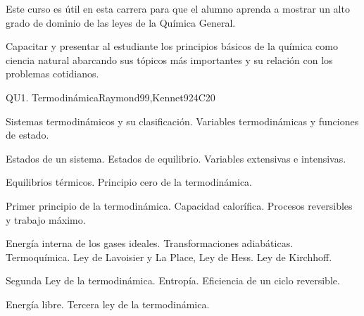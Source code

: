 \begin{syllabus}


\begin{justification}
Este curso es útil en esta carrera para que el alumno aprenda a mostrar un alto grado de dominio de las leyes de la Química General.
\end{justification}

\begin{goals}
\item Capacitar y presentar al estudiante los principios básicos de la química como ciencia natural abarcando sus tópicos más importantes y su relación con los problemas cotidianos.
\end{goals}

\begin{outcomes}
\item {}
\item {}
\end{outcomes}

\begin{competences}
    \item {}
\end{competences}

\begin{unit}{QU1. Termodinámica}{}{Raymond99,Kennet92}{4}{C20}
\begin{topics}
      \item Sistemas termodinámicos y su clasificación. Variables termodinámicas y funciones de estado.
      \item Estados de un sistema. Estados de equilibrio. Variables extensivas e intensivas.
      \item Equilibrios térmicos. Principio cero de la termodinámica.
      \item Primer principio de la termodinámica. Capacidad calorífica. Procesos reversibles y trabajo máximo.
      \item Energía interna de los gases ideales. Transformaciones adiabáticas. Termoquímica. Ley de Lavoisier y La Place, Ley de Hess. Ley de Kirchhoff.
      \item Segunda Ley de la termodinámica. Entropía. Eficiencia de un ciclo reversible.
	\item Energía libre. Tercera ley de la termodinámica.
   \end{topics}


\end{unit}
\end{syllabus}
